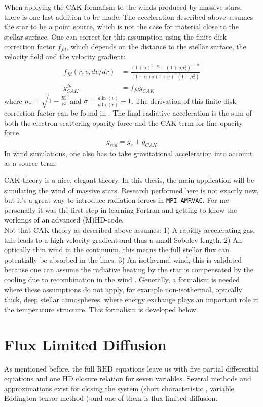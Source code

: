 When applying the CAK-formalism to the winds produced by massive stars, there is one last addition to be made. The acceleration described above assumes the star to be a point source, which is not the case for material close to the stellar surface. One can correct for this assumption using the finite disk correction factor $f_{fd}$, which depends on the distance to the stellar surface, the velocity field and the velocity gradient:
\begin{align}
f_{fd}(r,v,dv/dr) &= \frac{(1 + \sigma)^{1+\alpha}-(1+\sigma \mu_*^2)^{1+\alpha}}{(1+\alpha)\sigma(1+\sigma)^\alpha(1-\mu_*^2)} \\ \label{eq: fin_disk_corr}
g_{CAK}^{fd} &= f_{fd} g_{CAK}
\end{align}
where $\mu_* = \sqrt{1-\frac{R_*^2}{r^2}}$ and $\sigma = \frac{d \ln(v)}{d\ln(r)}-1$. The derivation of this finite disk correction factor can be found in \citep{Owocki2003}. The final radiative acceleration is the sum of both the electron scattering opacity force and the CAK-term for line opacity force.\\
\begin{align}
g_{rad} = g_e + g_{CAK}
\end{align} 
In wind simulations, one also has to take gravitational acceleration into account as a source term.

CAK-theory is a nice, elegant theory. In this thesis, the main application will be simulating the wind of massive stars. Research performed here is not exactly new, but it's a great way to introduce radiation forces in \texttt{MPI-AMRVAC}. For me personally it was the first step in learning Fortran and getting to know the workings of an advanced (M)HD-code.\\

Not that CAK-theory as described above assumes: 1) A rapidly accelerating gas, this leads to a high velocity gradient and thus a small Sobolev length. 2) An optically thin wind in the continuum, this means the full stellar flux can potentially be absorbed in the lines. 3) An isothermal wind, this is validated because one can assume the radiative heating by the star is compensated by the cooling due to recombination in the wind \citep{}. Generally, a formalism is needed where these assumptions do not apply, for example non-isothermal, optically thick, deep stellar atmospheres, where energy exchange plays an important role in the temperature structure. This formalism is developed below.


\section{Flux Limited Diffusion} \label{section: introduction Flux Limited Diffusion}
As mentioned before, the full RHD equations leave us with five partial differential equations and one HD closure relation for seven variables. Several methods and approximations exist for closing the system (short characteristic \citep{Davis2012}, variable Eddington tensor method \citep{Jiang2012}) and one of them is flux limited diffusion. \\

